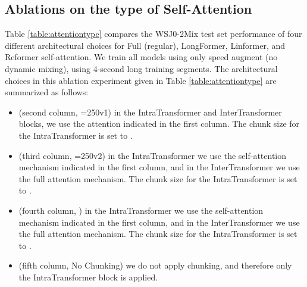 \documentclass[lettersize,journal]{IEEEtran}
\begin{document}
\subsection{Ablations on the type of Self-Attention}


\begin{table*}[t!]
 \caption{Comparison of different types of self-attention (WSJ0-2Mix, test set). }
 \vspace{0.1cm}
 \label{table:attentiontype}
 \centering
{}
\end{table*}


Table \ref{table:attentiontype} compares the WSJ0-2Mix test set performance of four different architectural choices for Full (regular), LongFormer, Linformer, and Reformer self-attention. We train all models using only speed augment (no dynamic mixing), using 4-second long training segments. The architectural choices in this ablation experiment given in Table \ref{table:attentiontype} are summarized as follows:

\begin{itemize}
    \item (second column, \chnksize=250v1) in the IntraTransformer and InterTransformer blocks, we use the attention indicated in the first column. The chunk size for the IntraTransformer is set to . 
    \item (third column, \chnksize=250v2) in the IntraTransformer we use the self-attention mechanism indicated in the first column, and in the InterTransformer we use the full attention mechanism. The chunk size for the IntraTransformer is set to . 
    \item (fourth column, ) in the IntraTransformer we use the self-attention mechanism indicated in the first column, and in the InterTransformer we use the full attention mechanism. The chunk size for the IntraTransformer is set to .  
    \item (fifth column, No Chunking) we do not apply chunking, and therefore only the IntraTransformer block is applied. 
\end{itemize}
\end{document}
